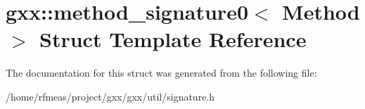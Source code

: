 \hypertarget{structgxx_1_1method__signature0}{}\section{gxx\+:\+:method\+\_\+signature0$<$ Method $>$ Struct Template Reference}
\label{structgxx_1_1method__signature0}


The documentation for this struct was generated from the following file\+:\begin{DoxyCompactItemize}
\item 
/home/rfmeas/project/gxx/gxx/util/signature.\+h\end{DoxyCompactItemize}
